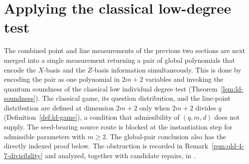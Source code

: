\section{Applying the classical low-degree test}
\label{sec:apply-ldt}

The combined point and line measurements of the previous two sections are next
merged into a single measurement returning a pair of global polynomials that
encode the $X$-basis and the $Z$-basis information simultaneously. This is
done by encoding the pair as one polynomial in $2m+2$ variables and invoking
the quantum soundness of the classical low individual degree test
(Theorem~\ref{lem:ld-soundness}). The classical game, its question
distribution, and the line-point distribution are defined at dimension $2m+2$
only when $2m+2$ divides $q$ (Definition~\ref{def:ld-game}), a condition that
admissibility of $(q,m,d)$ does not supply. The seed-bearing source route is
blocked at the instantiation step for admissible parameters with $m \ge 2$.
The global-pair conclusion also has the directly indexed proof below. The
obstruction is recorded in Remark~\ref{rem:qld-4-7-divisibility} and
analyzed, together with candidate repairs, in
\cite{gap:qpbt_ld-dimension-divisibility}.

